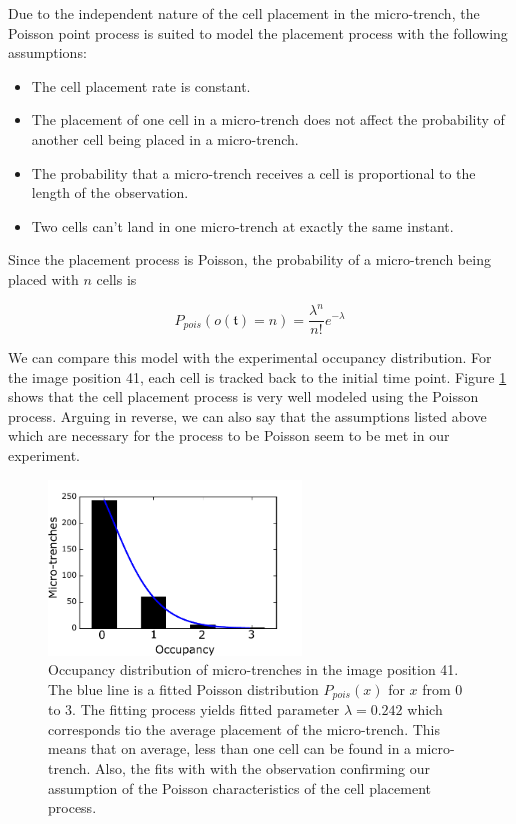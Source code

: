 \documentclass[pdftex,12pt,a4paper]{report}
\begin{document}
Due to the independent nature of the cell placement in the micro-trench, the Poisson point process is suited to model the placement process \cite{miles1970homogeneous} with the following assumptions:

\begin{itemize}
\item The cell placement rate is constant.
\item The placement of one cell in a micro-trench does not affect the probability of another cell being placed in a micro-trench.
\item The probability that a micro-trench receives a cell is proportional to the length of the observation.
\item Two cells can't land in one micro-trench at exactly the same instant.
\end{itemize}

Since the placement process is Poisson, the probability of a micro-trench being placed with $n$ cells is

\begin{equation}
P_{pois}(o(\mathfrak{t}) = n) = \frac{\lambda^n}{n!} e^{-\lambda}
\end{equation}

We can compare this model with the experimental occupancy distribution. For the image position 41, each cell is tracked back to the initial time point. Figure \ref{fig:cell_placements_dist} shows that the cell placement process is very well modeled using the Poisson process. Arguing in reverse, we can also say that the assumptions  listed above which are necessary for the process to be Poisson seem to be met in our experiment.

\begin{figure}[H]
\centering
\includegraphics[width=0.6\textwidth]{images/occupancy_distribution.pdf}
\caption[Occupancy distribution of micro-trenches in the image position 41.]{Occupancy distribution of micro-trenches in the image position 41. The blue line is a fitted Poisson distribution $P_{pois}(x)$  for $x$ from 0 to 3. The fitting process yields fitted parameter $\lambda = 0.242$  which corresponds tio the average placement of the micro-trench. This means that on average, less than one cell can be found in a micro-trench. Also, the fits with with the observation confirming our assumption of the Poisson characteristics of the cell placement process.}
\label{fig:cell_placements_dist}
\end{figure}
\end{document}
